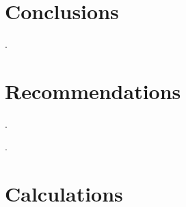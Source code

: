 \documentclass[10pt]{article}
\begin{document}
\section{Conclusions}
.
\newpage

\section{Recommendations}
.
\newpage

.
\printbibliography
\newpage

\clearpage
\appendix

\section{Calculations}
\end{document}
